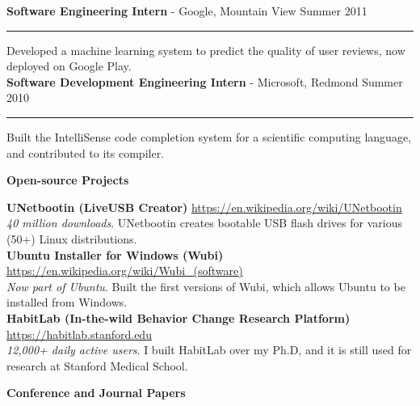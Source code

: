 \documentclass[10pt,A4]{article}
\newcommand{\cvsection}[1]
{
	\begin{center}
		\large\textcolor{sectcol}{\textbf{#1}}
	\end{center}
}
\newcommand{\cvevtone}[4]
{

	\textbf{#2} - \textcolor{bgcol}{#3} \hfill \vspace{2.5pt}\textcolor{sectcol}{#1}

\vspace{-8pt}
\textcolor{softcol}{\hrule}
\vspace{6pt}

  #4\\[3pt]

}
\begin{document}
\cvevtone{Summer 2011}{Software Engineering Intern}{Google, Mountain View}{Developed a machine learning system to predict the quality of user reviews, now deployed on Google Play.}

\cvevtone{Summer 2010}{Software Development Engineering Intern}{Microsoft, Redmond}{Built the IntelliSense code completion system for a scientific computing language, and contributed to its compiler.}


\cvsection{Open-source Projects}

\textbf{UNetbootin (LiveUSB Creator)} \hfill \url{https://en.wikipedia.org/wiki/UNetbootin}\\ %
\emph{40 million downloads}. UNetbootin creates bootable USB flash drives for various (50+) Linux distributions.\\ %

\textbf{Ubuntu Installer for Windows (Wubi)} \hfill \url{https://en.wikipedia.org/wiki/Wubi_(software)}\\ %
\emph{Now part of Ubuntu}. Built the first versions of Wubi, which allows Ubuntu to be installed from Windows.\\ %

\textbf{HabitLab (In-the-wild Behavior Change Research Platform)} \hfill \url{https://habitlab.stanford.edu}\\ %
\emph{12,000+ daily active users}. I built HabitLab over my Ph.D, and it is still used for research at Stanford Medical School.\\ %


\cvsection{Conference and Journal Papers}
\end{document}
